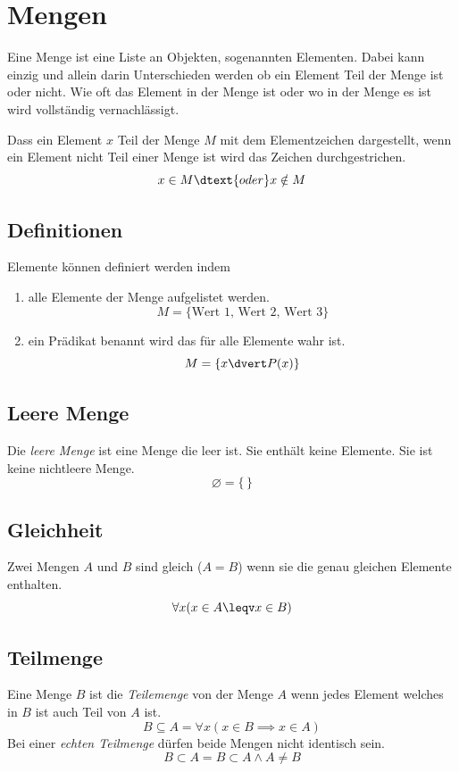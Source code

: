 \documentclass{article}
\begin{document}
\section{Mengen}
Eine Menge ist eine Liste an Objekten, sogenannten Elementen. Dabei kann einzig und allein darin Unterschieden werden ob ein Element Teil der Menge ist oder nicht. Wie oft das Element in der Menge ist oder wo in der Menge es ist wird vollständig vernachlässigt.

Dass ein Element $x$ Teil der Menge $M$ mit dem Elementzeichen dargestellt, wenn ein Element nicht Teil einer Menge ist wird das Zeichen durchgestrichen.
\[
 x \in M
 \dtext{oder}
 x \notin M
\]

\subsection{Definitionen}
Elemente können definiert werden indem
\begin{enumerate}
 \item alle Elemente der Menge aufgelistet werden.
\[
 M = \{\text{Wert 1, Wert 2, Wert 3}\}
\]
 \item ein Prädikat benannt wird das für alle Elemente wahr ist.
\[
 M = \{x \dvert P(x)\}
\]
\end{enumerate}

\subsection{Leere Menge}
Die \emph{leere Menge} ist eine Menge die leer ist. Sie enthält keine Elemente. Sie ist keine nichtleere Menge.
\[
 \varnothing = \{\,\}
\]

\subsection{Gleichheit}
Zwei Mengen $A$ und $B$ sind gleich ($A=B$) wenn sie die genau gleichen Elemente enthalten.
\[
 \forall x (x \in A \leqv x \in B)
\]

\subsection{Teilmenge}
Eine Menge $B$ ist die \emph{Teilemenge} von der Menge $A$ wenn jedes Element welches in $B$ ist auch Teil von $A$ ist.
\[
 B \subseteq A =
 \forall x (x \in B \implies x \in A)
\]
Bei einer \emph{echten Teilmenge} dürfen beide Mengen nicht identisch sein.
\[
 B \subset A = B \subset A \land A \neq B
\]
\end{document}
